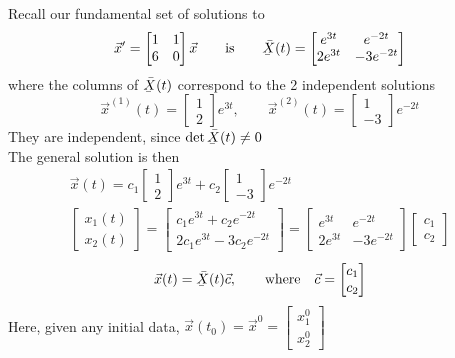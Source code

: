 Recall our fundamental set of solutions to
\begin{equation*}
	\vec{x}' = \begin{bmatrix}
		1 & 1\\ 6 & 0
	\end{bmatrix} \vec{x} \qquad \text{is} \qquad \Xlines(t) = \begin{bmatrix}
		e^{3t} & e^{-2t}\\
		2e^{3t} & -3e^{-2t}
	\end{bmatrix}
\end{equation*}
where the columns of $\Xlines(t)$ correspond to the 2 independent solutions
\begin{equation*}
	\vec{x}^{(1)}(t) = \begin{bmatrix}
		1 \\ 2
	\end{bmatrix} e^{3t}, \qquad \vec{x}^{(2)}(t) = \begin{bmatrix}
		1 \\ -3
	\end{bmatrix} e^{-2t}
\end{equation*}
They are independent, since $\det \Xlines(t) \neq 0$\\
The general solution is then\\
\begin{gather*}
	\vec{x}(t) = c_1 \begin{bmatrix}
		1 \\ 2
	\end{bmatrix} e^{3t} + c_2 \begin{bmatrix}
		1 \\ -3
	\end{bmatrix} e^{-2t}\\
	\begin{bmatrix}
		x_1(t)\\
		x_2(t)
	\end{bmatrix} = 
	\begin{bmatrix}
		c_1 e^{3t} + c_2 e^{-2t}\\
		2c_1 e^{3t} - 3c_2 e^{-2t}
	\end{bmatrix} = 
	\begin{bmatrix}
		e^{3t} & e^{-2t}\\
		2e^{3t} & -3e^{-2t}
	\end{bmatrix} 
	\begin{bmatrix}
		c_1\\
		c_2
	\end{bmatrix}
\end{gather*}
\begin{equation*}
	\vec{x}(t) = \Xlines(t)\vec{c}, \qquad \text{where} \quad \vec{c} = \begin{bmatrix}
	c_1\\
	c_2
	\end{bmatrix}
\end{equation*}
Here, given any initial data, $\vec{x}(t_0) = \vec{x}^0 = \begin{bmatrix}
	x_1^0\\
	x_2^0
\end{bmatrix}$